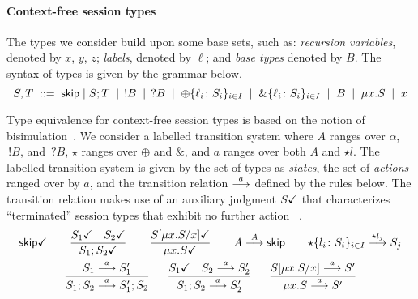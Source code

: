 \paragraph{Context-free session types}
\label{sec:contextfreesession}

The types we consider build upon some base sets, such as:
\emph{recursion variables}, denoted by $x$, $y$, $z$;
\emph{labels}, denoted by $\ell$; and \emph{base types} denoted by
$B$.  The syntax of types is given by the grammar below.%
%
\begin{equation*}
    S,T \grmeq \skipk \mid S;T \grmor \,!B \grmor \,?B \grmor 
       \oplus\{\ell_i\colon S_i\}_{i\in I} \grmor \&\{\ell_i\colon S_i\}_{i\in I} \grmor B \grmor
       \mu x.S \grmor x
\end{equation*}

Type equivalence for context-free session types is based on the notion
of bisimulation~\cite{thiemann2016context}.%
We consider a labelled transition system where $A$ ranges
over $\alpha$, $\,!B$, and $\,?B$, $\star$ ranges over $\oplus$ and
$\&$, and $a$ ranges over both $A$ and $\star l$.
%
The labelled transition system is given by the set of types as
\emph{states}, the set of \emph{actions} ranged over by $a$, and the
transition relation $\LTSderives$ defined by the rules below. The
transition relation makes use of an auxiliary judgment $\DONE{S}$ that
characterizes ``terminated'' session types that exhibit no further
action~\cite{DBLP:journals/jacm/AcetoH92} .
%
  \begin{gather*}
    \DONE{\skipk}
    \qquad
    \frac{\DONE{S_1} \quad \DONE{S_2}}{\DONE{S_1; S_2}}
    \qquad
    \frac{\DONE{S[\mu x.S/x]}}{\DONE{\mu x.S}}
    \qquad
    {A \LTSderives[A] \skipk }
    \qquad
    {\star\{l_i\colon S_i\}_{i\in I} \LTSderives[\star l_j] S_j}
    \\
    \frac{S_1 \LTSderives S_1'}{S_1; S_2 \LTSderives S_1';S_2}
    \quad\;\;
    \frac{\DONE{S_1} \quad S_2 \LTSderives S_2'}{S_1; S_2 \LTSderives S_2'}
    \quad\;\;
    \frac{S[\mu x.S/x] \LTSderives S'}{\mu x.S \LTSderives S'}
  \end{gather*}

